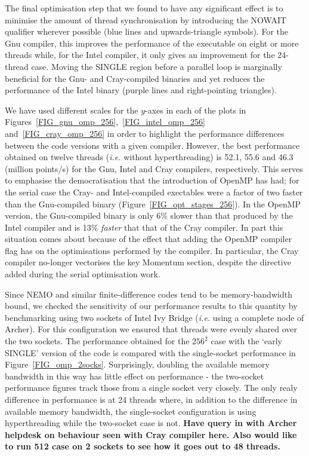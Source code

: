\documentclass[journal]{IEEEtran}
\begin{document}
The final optimisation step that we found to have any significant
effect is to minimise the amount of thread synchronisation by
introducing the NOWAIT qualifier wherever possible (blue lines and
upwards-triangle symbols). For the Gnu compiler, this improves the
performance of the executable on eight or more threads while, for the
Intel compiler, it only gives an improvement for the 24-thread
case. Moving the SINGLE region before a parallel loop is marginally
beneficial for the Gnu- and Cray-compiled binaries and yet reduces the
performance of the Intel binary (purple lines and right-pointing
triangles).

We have used different scales for the $y$-axes in each of the plots in
Figures~\ref{FIG_gnu_omp_256},~\ref{FIG_intel_omp_256}
and~\ref{FIG_cray_omp_256} in order to highlight the performance
differences between the code versions with a given compiler. However,
the best performance obtained on twelve threads ({\it i.e.}  without
hyperthreading) is 52.1, 55.6 and 46.3 (million points/s) for the Gnu,
Intel and Cray compilers, respectively. This serves to emphasise the
democratisation that the introduction of OpenMP has had; for the
serial case the Cray- and Intel-compiled exectables were a factor of
two faster than the Gnu-compiled binary
(Figure~\ref{FIG_opt_stages_256}). In the OpenMP version, the
Gnu-compiled binary is only 6\% slower than that produced by the Intel
compiler and is 13\% {\em faster} that that of the Cray compiler. In
part this situation comes about because of the effect that adding the
OpenMP compiler flag has on the optimisations performed by the
compiler.  In particular, the Cray compiler no-longer vectorises the
key Momentum section, despite the directive added during the serial
optimisation work.

Since NEMO and similar finite-difference codes tend to be
memory-bandwidth bound, we checked the sensitivity of our performance
results to this quantity by benchmarking using two sockets of Intel
Ivy Bridge ({\it i.e.} using a complete node of Archer). For this
configuration we ensured that threads were evenly shared over the two
sockets. The performance obtained for the $256^2$ case with the `early
SINGLE' version of the code is compared with the single-socket
performance in Figure~\ref{FIG_omp_2socks}. Surprisingly, doubling the
available memory bandwidth in this way has little effect on
performance - the two-socket performance figures track those from a
single socket very closely. The only realy difference in performance
is at 24 threads where, in addition to the difference in available
memory bandwidth, the single-socket configuration is using
hyperthreading while the two-socket case is not.  {\bf Have query in
  with Archer helpdesk on behaviour seen with Cray compiler here. Also
  would like to run 512 case on 2 sockets to see how it goes out to 48
  threads.}
\end{document}
